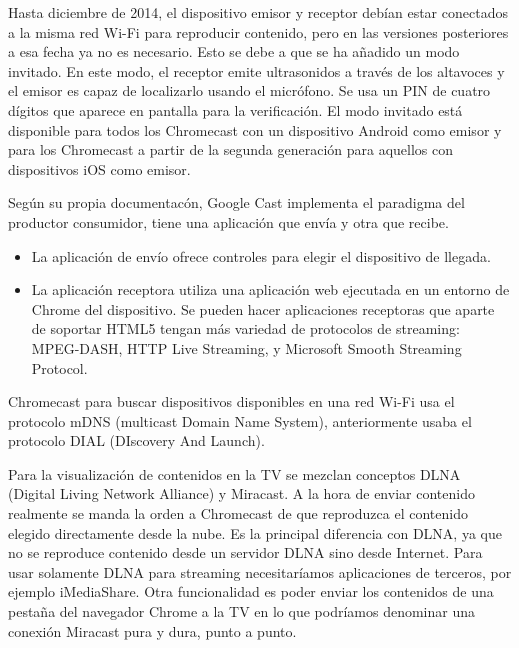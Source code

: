 Hasta diciembre de 2014, el dispositivo emisor y receptor debían estar conectados a la misma red Wi-Fi para reproducir contenido, pero en las versiones posteriores a esa fecha ya no es necesario.
Esto se debe a que se ha añadido un modo invitado.
En este modo, el receptor emite ultrasonidos a través de los altavoces y el emisor es capaz de localizarlo usando el micrófono.
Se usa un PIN de cuatro dígitos que aparece en pantalla para la verificación.
El modo invitado está disponible para todos los Chromecast con un dispositivo Android como emisor y para los Chromecast a partir de la segunda generación para aquellos con dispositivos iOS como emisor.

Según su propia documentacón, Google Cast implementa el paradigma del productor consumidor, tiene una aplicación que envía y otra que recibe.
\begin{itemize}
	\item La aplicación de envío ofrece controles para elegir el dispositivo de llegada.
	\item La aplicación receptora utiliza una aplicación web ejecutada en un entorno de Chrome del dispositivo. Se pueden hacer aplicaciones receptoras que aparte de soportar HTML5 tengan más variedad de protocolos de streaming: MPEG-DASH, HTTP Live Streaming, y Microsoft Smooth Streaming Protocol.
\end{itemize}

Chromecast para buscar dispositivos disponibles en una red Wi-Fi usa el protocolo mDNS (multicast Domain Name System), anteriormente usaba el protocolo DIAL (DIscovery And Launch).

Para la visualización de contenidos en la TV se mezclan conceptos DLNA (Digital Living Network Alliance) y Miracast\cite{DLNA-Miracast}.
A la hora de enviar contenido realmente se manda la orden a Chromecast de que reproduzca el contenido elegido directamente desde la nube.
Es la principal diferencia con DLNA, ya que no se reproduce contenido desde un servidor DLNA sino desde Internet.
Para usar solamente DLNA para streaming necesitaríamos aplicaciones de terceros, por ejemplo iMediaShare.
Otra funcionalidad es poder enviar los contenidos de una pestaña del navegador Chrome a la TV en lo que podríamos denominar una conexión Miracast pura y dura, punto a punto.




